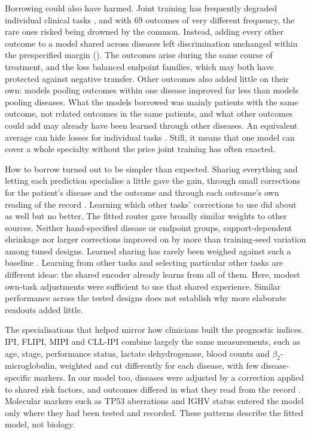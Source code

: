 Borrowing could also have harmed. Joint training has frequently degraded
individual clinical tasks \citep{mcdermott2020mtl}, and with 69 outcomes of very
different frequency, the rare ones risked being drowned by the common. Instead,
adding every other outcome to a model shared across diseases left discrimination
unchanged within the prespecified margin (). The outcomes arise during the same course of treatment, and the loss balanced
endpoint families, which may both have protected against negative transfer. Other outcomes also added
little on their own: models pooling outcomes within one disease improved far
less than models pooling diseases. What the models borrowed was mainly patients
with the same outcome, not related outcomes in the same patients, and what other
outcomes could add may already have been learned through other diseases. An
equivalent average can hide losses for individual tasks
. Still, it means that one
model can cover a whole specialty without the price joint training has often
exacted.

How to borrow turned out to be simpler than expected. Sharing everything and
letting each prediction specialise a little gave the gain, through small
corrections for the patient's disease and the outcome and through each
outcome's own reading of the record .
Learning which other tasks' corrections to use did about as well but no better.
The fitted router gave broadly similar weights to other sources. Neither
hand-specified disease or endpoint groups, support-dependent shrinkage nor
larger corrections improved on \opera{} by more than training-seed variation
among  tuned designs. Learned sharing has rarely been weighed
against such a baseline \citep{ma2018mmoe,mcdermott2020mtl}. Learning from other
tasks and selecting particular other tasks are different ideas: the shared
encoder already learns from all of them. Here, modest own-task adjustments
were sufficient to use that shared experience. Similar performance across the
tested designs does not establish why more elaborate readouts added little.

The specialisations that helped mirror how clinicians built the prognostic
indices. IPI, FLIPI, MIPI and CLL-IPI combine largely the same measurements, such
as age, stage, performance status, lactate dehydrogenase, blood counts and
$\beta_2$-microglobulin, weighted and cut differently for each disease, with few
disease-specific markers.  In our
model too, diseases were adjusted by a correction applied to shared risk
factors, and outcomes differed in what they read from the record
. Molecular markers such
as TP53 aberrations and IGHV status entered the model only where they had been
tested and recorded.  These patterns describe the fitted
model, not biology.

